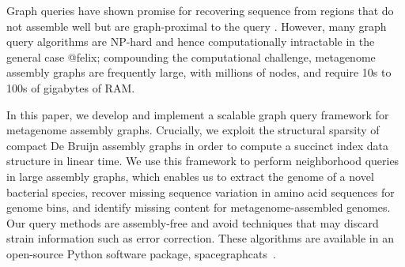 Graph queries have shown promise for recovering sequence from regions that do
not assemble well but are graph-proximal to the query \cite{metacherchant,perchlorate}. However, many graph query
algorithms are NP-hard and hence computationally intractable in the
general case @felix; compounding the computational challenge, metagenome assembly
graphs are frequently large, with millions of nodes, and require 10s
to 100s of gigabytes of RAM.

In this paper, we develop and implement a scalable graph query
framework for metagenome assembly graphs. Crucially, we exploit the structural sparsity of compact De Bruijn
assembly graphs in order to compute a succinct index data structure in linear
time. We use this framework to perform neighborhood
queries in large assembly graphs, which enables us to extract the
genome of a novel bacterial species, recover missing sequence
variation in amino acid sequences for genome bins, and identify
missing content for metagenome-assembled genomes.  Our query methods
are assembly-free and avoid techniques that
may discard strain information such as error correction.  These algorithms are available in an
open-source Python software package,
\textsf{spacegraphcats}~\cite{spacegraphcats}.

